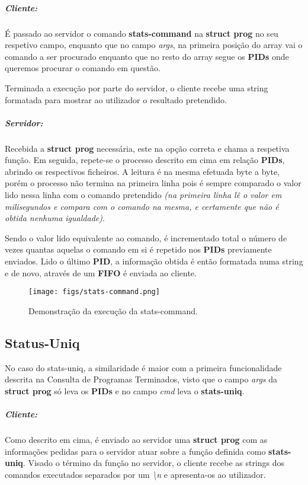 \documentclass[11.5pt,a4paper]{report}
\begin{document}
\subparagraph{Cliente:}
É passado ao servidor o comando \textbf{stats-command} na \textbf{struct prog} no seu respetivo campo, enquanto que no campo \textit{args}, na primeira posição do array vai o comando a ser procurado enquanto que no resto do array segue os \textbf{PIDs} onde queremos procurar o comando em questão.\par
Terminada a execução por parte do servidor, o cliente recebe uma string formatada para mostrar ao utilizador o resultado pretendido.

\subparagraph{Servidor:}
Recebida a \textbf{struct prog} necessária, este na opção correta e chama a respetiva função. Em seguida, repete-se o processo descrito em cima em relação \textbf{PIDs}, abrindo os respectivos ficheiros. A leitura é na mesma efetuada byte a byte, porém o processo não termina na primeira linha pois é sempre comparado o valor lido nessa linha com o comando pretendido \textit{(na primeira linha lê o valor em milisegundos e compara com o comando na mesma, e certamente que não é obtida nenhuma igualdade)}.\par
Sendo o valor lido equivalente ao comando, é incrementado total o número de vezes quantas aquelas o comando em si é repetido nos \textbf{PIDs} previamente enviados.
Lido o último \textbf{PID}, a informação obtida é então formatada numa string e de novo, através de um \textbf{FIFO} é enviada ao cliente.\\

\begin{figure}[h]
    \centering
    \texttt{[image: figs/stats-command.png]}
    \caption{Demonstração da execução da stats-command.}
    \label{f}
\end{figure}

\subsection{Status-Uniq}
No caso do stats-uniq, a similaridade é maior com a primeira funcionalidade descrita na Consulta de Programas Terminados, visto que o campo \textit{args} da \textbf{struct prog} só leva os \textbf{PIDs} e no campo \textit{cmd} leva o \textbf{stats-uniq}.

\subparagraph{Cliente:} Como descrito em cima, é enviado ao servidor uma \textbf{struct prog} com as informações pedidas para o servidor atuar sobre a função definida como \textbf{stats-uniq}.
Visado o término da função no servidor, o cliente recebe as strings dos comandos executados separados por um \textit{\textbackslash n} e apresenta-os ao utilizador.
\end{document}
